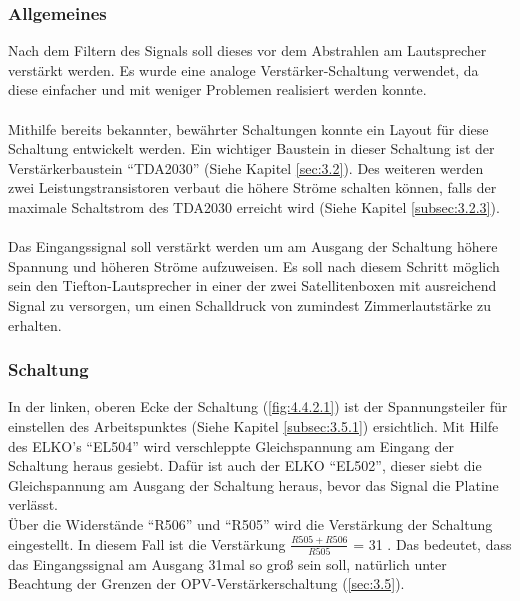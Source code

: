 \subsubsection{Allgemeines}\label{subsec:4.4.1}
Nach dem Filtern des Signals soll dieses vor dem Abstrahlen am Lautsprecher verstärkt werden.
Es wurde eine analoge Verstärker-Schaltung verwendet, da diese einfacher und mit weniger Problemen realisiert werden konnte.
\\ \\
Mithilfe bereits bekannter, bewährter Schaltungen konnte ein Layout für diese Schaltung entwickelt werden.
Ein wichtiger Baustein in dieser Schaltung ist der Verstärkerbaustein \enquote{TDA2030} (Siehe Kapitel \ref{sec:3.2}).
Des weiteren werden zwei Leistungstransistoren verbaut die höhere Ströme schalten können, falls der maximale Schaltstrom des TDA2030 erreicht wird (Siehe Kapitel \ref{subsec:3.2.3}).
\\ \\
Das Eingangssignal soll verstärkt werden um am Ausgang der Schaltung höhere Spannung und höheren Ströme aufzuweisen.
Es soll nach diesem Schritt möglich sein den Tiefton-Lautsprecher in einer der zwei Satellitenboxen mit ausreichend Signal zu versorgen, um einen Schalldruck von zumindest Zimmerlautstärke zu erhalten. 

\newpage
\subsubsection{Schaltung}\label{subsec:4.4.2}
In der linken, oberen Ecke der Schaltung (\ref{fig:4.4.2.1}) ist der Spannungsteiler für einstellen des Arbeitspunktes (Siehe Kapitel \ref{subsec:3.5.1}) ersichtlich.
Mit Hilfe des ELKO's \enquote{EL504} wird verschleppte Gleichspannung am Eingang der Schaltung heraus gesiebt.
Dafür ist auch der ELKO \enquote{EL502}, dieser siebt die Gleichspannung am Ausgang der Schaltung heraus, bevor das Signal die Platine verlässt. \\
Über die Widerstände \enquote{R506} und \enquote{R505} wird die Verstärkung der Schaltung eingestellt.
In diesem Fall ist die Verstärkung $\frac{R505+R506}{R505}$ = 31 .
Das bedeutet, dass das Eingangssignal am Ausgang 31mal so groß sein soll, natürlich unter Beachtung der Grenzen der OPV-Verstärkerschaltung (\ref{sec:3.5}).

